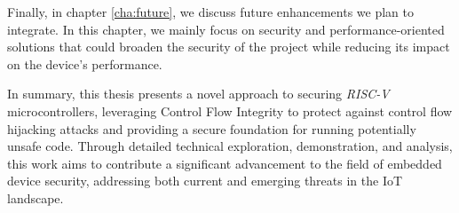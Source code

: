 Finally, in chapter \ref{cha:future}, we discuss future enhancements we plan to
integrate. In this chapter, we mainly focus on security and performance-oriented
solutions that could broaden the security of the project while reducing its
impact on the device's performance.

In summary, this thesis presents a novel approach to securing \textit{RISC-V}
microcontrollers, leveraging Control Flow Integrity to protect against control flow
hijacking attacks and providing a secure foundation for running potentially unsafe
code. Through detailed technical exploration, demonstration, and analysis, this work
aims to contribute a significant advancement to the field of embedded device security,
addressing both current and emerging threats in the IoT landscape.
